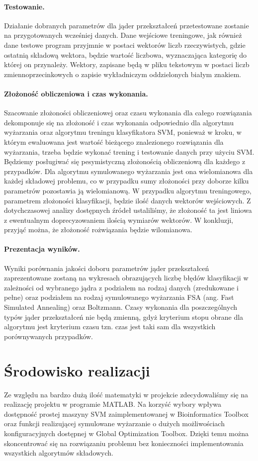 \documentclass{article}
\begin{document}
\paragraph{Testowanie.}
Działanie dobranych parametrów dla jąder przekształceń przetestowane zostanie na przygotowanych wcześniej danych. Dane wejściowe treningowe, jak również dane testowe program przyjmnie w postaci wektorów liczb rzeczywistych, gdzie ostatnią składową wektora, będzie wartość liczbowa, wyznaczająca kategorię do której on przynależy. Wektory, zapisane będą w pliku tekstowym w postaci liczb zmiennoprzecinkowych o zapisie wykładniczym oddzielonych białym znakiem.
\paragraph{Złożoność obliczeniowa i czas wykonania.}
Szacowanie złożoności obliczeniowej oraz czasu wykonania dla całego rozwiązania dekomponuje się na złożoność i czas wykonania odpowiednio dla algorytmu wyżarzania oraz  algorytmu treningu klasyfikatora SVM, ponieważ w kroku, w którym ewaluowana jest wartość bieżącego znalezionego rozwiązania dla wyżarzania, trzeba będzie wykonać trening i testowanie danych przy użyciu SVM.
Będziemy posługiwać się pesymistyczną złożonością obliczeniową dla każdego z przypadków. Dla algorytmu symulowanego wyżarzania jest ona wielomianowa dla każdej składowej problemu, co w przypadku sumy złożoności przy doborze kilku parametrów pozostawia ją wielomianową. W przypadku algorytmu treningowego, parametrem złożoności klasyfikacji, będzie ilość danych wektorów wejściowych. Z dotychczasowej analizy dostępnych źródeł ustaliliśmy, że złożoność ta jest liniowa z ewentualnym doprecyzowaniem ilością wymiarów wektorów. W konkluzji, przyjąć można, że złożoność rożwiązania będzie wilomianowa.
\paragraph{Prezentacja wyników.}
Wyniki porównania jakości doboru parametrów jąder przekształceń zaprezentowane zostaną na wykresach obrazujących liczbę błędów klasyfikacji w zależności od wybranego jądra z podziałem na rodzaj danych (zredukowane i pełne) oraz podziałem na rodzaj symulowanego wyżarzania FSA (ang. Fast Simulated Annealing) oraz Boltzmann. Czasy wykonania dla poszczególnych typów jąder przekształceń nie będą zmienną, gdyż kryterium stopu obrane dla algorytmu jest kryterium czasu tzn. czas jest taki sam dla wszystkich porównywanych przypadków. 
\section{Środowisko realizacji}
Ze względu na bardzo dużą ilość matematyki w projekcie zdecydowaliśmy się na realizację projektu w programie MATLAB. Na korzyść wybory wpływa dostępność prostej maszyny SVM zaimplementowanej w Bioinformatics Toolbox oraz funkcji realizującej symulowane wyżarzanie o dużych możliwościach konfiguracyjnych dostępnej w Global Optimization Toolbox. Dzięki temu można skoncentrować się na rozwiązaniu problemu bez konieczności implementowania wszystkich algorytmów składowych.
\end{document}
